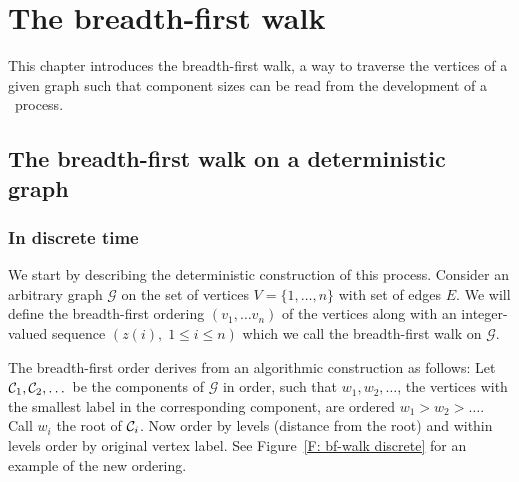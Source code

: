 
\chapter{The breadth-first walk} \label{C: bf-walk}

This chapter introduces the breadth-first walk, 
a way to traverse the vertices of a given graph such that component sizes can be read from the development of a \cadlag~process. 

\section{The breadth-first walk on a deterministic graph}

\subsection{In discrete time}
We start by describing the deterministic construction of this process.
Consider an arbitrary graph $\mathcal{G}$ on the set of vertices 
$V = \{1, \dots , n\} $ with set of edges $E$.
We will define the breadth-first ordering
$(v_1, \dots v_n)$
of the vertices along with an integer-valued sequence
$(z(i), \; 1 \leq i \leq n)$
which we call the breadth-first walk on
$\mathcal{G}$.


The breadth-first order derives from an algorithmic construction as follows:
Let $\mathcal{C}_{1}, \mathcal{C}_{2}, \dots$ be the components of $\mathcal{G}$ in order, such that
$w_1, w_2, \dots$, the vertices with the smallest label in the corresponding component,
are ordered $w_1 > w_2 > \dots$. 
Call $w_i$ the root of $\mathcal{C}_{i}$.
Now order by levels (distance from the root) and within levels order by original vertex label.
See Figure~\ref{F: bf-walk discrete} for an example of the new ordering.

